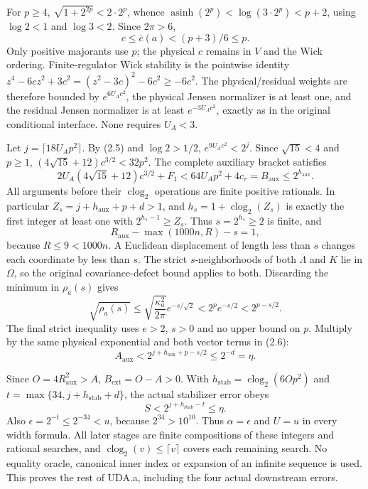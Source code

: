 \documentclass[11pt]{article}
\theoremstyle{plain}
\theoremstyle{definition}
\theoremstyle{remark}
\begin{document}
For $p\ge4$, $\sqrt{1+2^{2p}}<2\cdot2^p$, whence
$\operatorname{asinh}(2^p)<\log(3\cdot2^p)<p+2$, using
$\log2<1$ and $\log3<2$. Since $2\pi>6$,
\begin{equation}c\le\overline c(a)<(p+3)/6\le p.\tag{2.5}\end{equation}
Only positive majorants use $p$; the physical $c$ remains in $V$ and the
Wick ordering. Finite-regulator Wick stability is the pointwise identity
$z^4-6cz^2+3c^2=(z^2-3c)^2-6c^2\ge-6c^2$.
The physical/residual weights are therefore bounded by $e^{6U_Ac^2}$,
the physical Jensen normalizer is at least one, and the residual Jensen
normalizer is at least $e^{-3U_Ac^2}$, exactly as in the original
conditional interface. None requires $U_A<3$.

Let $j=\lceil18U_Ap^2\rceil$. By (2.5) and $\log2>1/2$,
$e^{9U_Ac^2}<2^j$. Since $\sqrt{15}<4$ and $p\ge1$,
$(4\sqrt{15}+12)c^{3/2}<32p^2$. The complete auxiliary bracket satisfies
\begin{equation}
 2U_A(4\sqrt{15}+12)c^{3/2}+F_1
 <64U_Ap^2+4c_r=B_{\mathrm{aux}}\le2^{h_{\mathrm{aux}}}.\tag{2.6}
\end{equation}
All arguments before their $\operatorname{clog}_2$ operations are finite
positive rationals. In particular $Z_s=j+h_{\mathrm{aux}}+p+d>1$, and
$h_s=1+\operatorname{clog}_2(Z_s)$ is exactly the first integer at least
one with $2^{h_s-1}\ge Z_s$. Thus $s=2^{h_s}\ge2$ is finite, and
\[
 R_{\mathrm{aux}}-\max(1000n,R)-s=1,
\]
because $R\le9<1000n$. A Euclidean displacement of length less than $s$
changes each coordinate by less than $s$. The strict $s$-neighborhoods
of both $\overline\Lambda$ and $K$ lie in $\Omega$, so the original
covariance-defect bound applies to both. Discarding the minimum in
$\rho_a(s)$ gives
\begin{equation}
 \sqrt{\rho_a(s)}\le\sqrt{\frac{\kappa_a^2}{2\pi}}e^{-s/\sqrt2}
 <2^p e^{-s/2}<2^{p-s/2}.\tag{2.7}
\end{equation}
The final strict inequality uses $e>2$, $s>0$ and no upper bound on $p$.
Multiply by the same physical exponential and both vector terms in (2.6):
\begin{equation}
 A_{\mathrm{aux}}<2^{j+h_{\mathrm{aux}}+p-s/2}\le2^{-d}=\eta.\tag{2.8}
\end{equation}

Since $O=4R_{\mathrm{aux}}^2>A$, $B_{\mathrm{ext}}=O-A>0$.
With $h_{\mathrm{stab}}=\operatorname{clog}_2(6Op^2)$ and
$t=\max\{34,j+h_{\mathrm{stab}}+d\}$, the actual stabilizer error obeys
\begin{equation}S<2^{j+h_{\mathrm{stab}}-t}\le\eta.\tag{2.9}\end{equation}
Also $\epsilon=2^{-t}\le2^{-34}<u$, because $2^{34}>10^{10}$.
Thus $\alpha=\epsilon$ and $U=u$ in every width formula.
All later stages are finite compositions of these integers and rational
searches, and $\operatorname{clog}_2(v)\le\lceil v\rceil$ covers each
remaining search. No equality oracle, canonical inner index or expansion
of an infinite sequence is used. This proves the rest of UDA.a, including
the four actual downstream errors.
\end{document}
